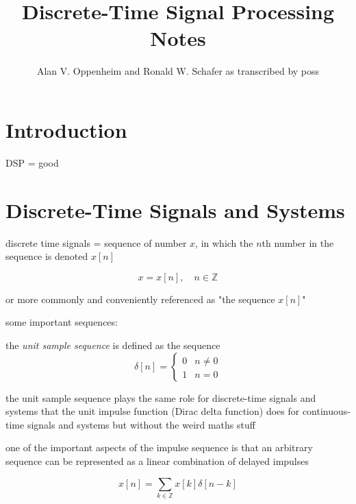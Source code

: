 \documentclass{article}
\title{Discrete-Time Signal Processing Notes}
\author{Alan V. Oppenheim and Ronald W. Schafer as transcribed by poss}
\begin{document}
\maketitle{}

\section{Introduction}

DSP = good

\section{Discrete-Time Signals and Systems}

discrete time signals = sequence of number \(x\), in which the \(n\)th number in the sequence is denoted \(x[n]\)

\[
	x = {x[n]}, \quad n \in \mathbb{Z} 
\]

or more commonly and conveniently referenced as "the sequence \(x[n]\)"


some important sequences:


the \textit{unit sample sequence} is defined as the sequence
\[
	\delta{}[n] =
	\begin{cases} 
		0 & n \neq 0 \\
		1 & n = 0
	\end{cases}
\]

the unit sample sequence plays the same role for discrete-time signals and systems that the unit impulse function (Dirac delta function) does for continuous-time signals and systems but without the weird maths stuff 


one of the important aspects of the impulse sequence is that an arbitrary sequence can be represented as a linear combination of delayed impulses

\[
	x[n] = \sum_{k \in \mathbb{Z}} x[k] \delta{}[n - k]
\]
\end{document}
